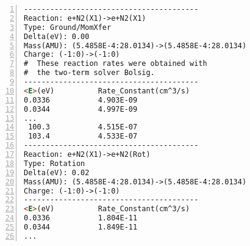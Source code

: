 \begin{lstlisting}[numbers=left,language=HTML,basicstyle=\small]
----------------------------------------
Reaction: e+N2(X1)->e+N2(X1)                            
Type: Ground/MomXfer					
Delta(eV): 0.00
Mass(AMU): (5.4858E-4:28.0134)->(5.4858E-4:28.0134)
Charge: (-1:0)->(-1:0)
#  These reaction rates were obtained with
#  the two-term solver Bolsig.
----------------------------------------
<E>(eV)          Rate_Constant(cm^3/s)
0.0336           4.903E-09
0.0344           4.997E-09
...
 100.3           4.515E-07
 103.4           4.533E-07
----------------------------------------
Reaction: e+N2(X1)->e+N2(Rot)
Type: Rotation
Delta(eV): 0.02
Mass(AMU): (5.4858E-4:28.0134)->(5.4858E-4:28.0134)
Charge: (-1:0)->(-1:0)
----------------------------------------
<E>(eV)          Rate_Constant(cm^3/s)
0.0336           1.804E-11
0.0344           1.849E-11
...
\end{lstlisting}



